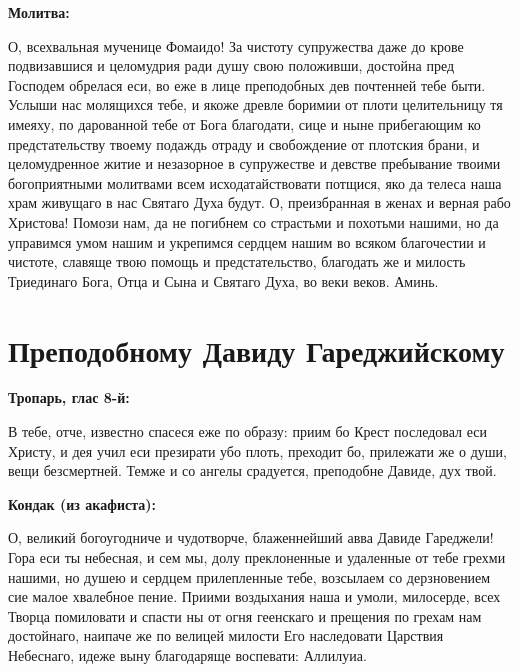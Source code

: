 \bfseries Молитва:\normalfont{}

 О, всехвальная мученице Фомаидо! За чистоту супружества даже до крове подвизавшися и целомудрия ради душу свою положивши, достойна пред Господем обрелася еси, во еже в лице преподобных дев почтенней тебе быти. Услыши нас молящихся тебе, и якоже древле боримии от плоти целительницу тя имеяху, по дарованной тебе от Бога благодати, сице и ныне прибегающим ко предстательству твоему подаждь отраду и свобождение от плотския брани, и целомудренное житие и незазорное в супружестве и девстве пребывание твоими богоприятными молитвами всем исходатайствовати потщися, яко да телеса наша храм живущаго в нас Святаго Духа будут. О, преизбранная в женах и верная рабо Христова! Помози нам, да не погибнем со страстьми и похотьми нашими, но да управимся умом нашим и укрепимся сердцем нашим во всяком благочестии и чистоте, славяще твою помощь и предстательство, благодать же и милость Триединаго Бога, Отца и Сына и Святаго Духа, во веки веков. Аминь. 

\bigskip\bigskip\mychapterending


 

\section{Преподобному Давиду Гареджийскому}
 


\bfseries Тропарь, глас 8-й:\normalfont{}


В тебе, отче, известно спасеся еже по образу: приим бо Крест последовал еси Христу, и дея учил еси презирати убо плоть, преходит бо, прилежати же о души, вещи безсмертней. Темже и со ангелы срадуется, преподобне Давиде, дух твой.


\medskip


\bfseries Кондак (из акафиста):\normalfont{}


О, великий богоугодниче и чудотворче, блаженнейший авва Давиде Гареджели! Гора еси ты небесная, и сем мы, долу преклоненные и удаленные от тебе грехми нашими, но душею и сердцем прилепленные тебе, возсылаем со дерзновением сие малое хвалебное пение. Приими воздыхания наша и умоли, милосерде, всех Творца помиловати и спасти ны от огня геенскаго и прещения по грехам нам достойнаго, наипаче же по велицей милости Его наследовати Царствия Небеснаго, идеже выну благодаряще воспевати: Аллилуиа.


